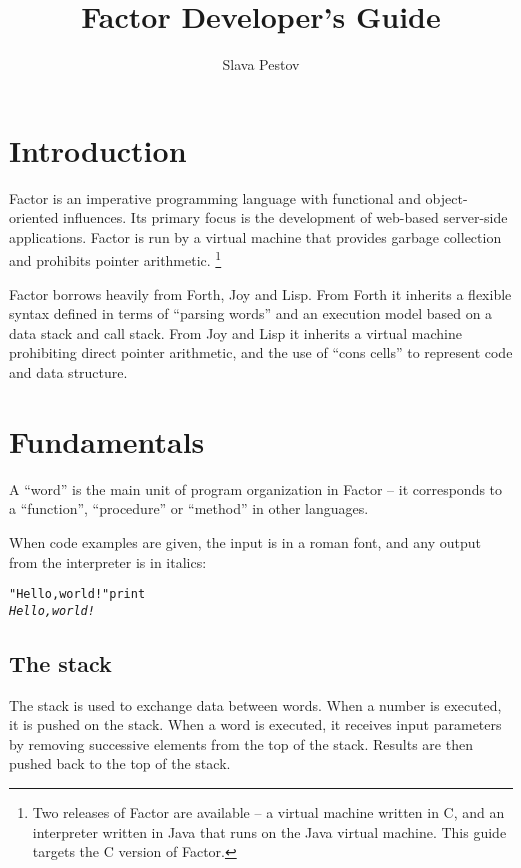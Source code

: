 \documentclass[english]{article}
\begin{document}
\title{Factor Developer's Guide}


\author{Slava Pestov}

\maketitle
\tableofcontents{}


\newpage
\section*{Introduction}

Factor is an imperative programming language with functional and object-oriented
influences. Its primary focus is the development of web-based server-side
applications. Factor is run by a virtual machine that provides
garbage collection and prohibits pointer arithmetic.%
\footnote{Two releases of Factor are available -- a virtual machine written
in C, and an interpreter written in Java that runs on the Java virtual
machine. This guide targets the C version of Factor.%
}

Factor borrows heavily from Forth, Joy and Lisp. From Forth it inherits
a flexible syntax defined in terms of ``parsing words'' and an
execution model based on a data stack and call stack. From Joy and
Lisp it inherits a virtual machine prohibiting direct pointer arithmetic,
and the use of ``cons cells'' to represent code and data structure.


\section{Fundamentals}

A ``word'' is the main unit of program organization
in Factor -- it corresponds to a ``function'', ``procedure''
or ``method'' in other languages.

When code examples are given, the input is in a roman font, and any
output from the interpreter is in italics:

\begin{alltt}
"Hello, world!" print
\emph{Hello, world!}
\end{alltt}

\subsection{The stack}

The stack is used to exchange data between words. When a number is
executed, it is pushed on the stack. When a word is executed, it receives
input parameters by removing successive elements from the top of the
stack. Results are then pushed back to the top of the stack. 
\end{document}
